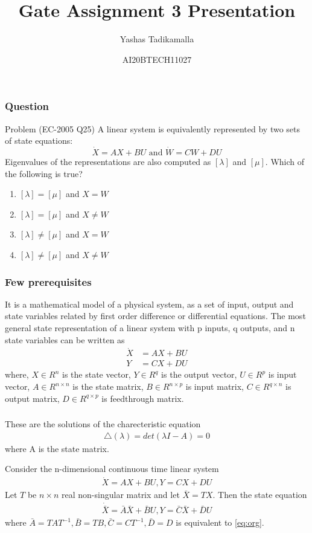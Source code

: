 \documentclass{beamer}
\title{Gate Assignment 3 Presentation}
\author{Yashas Tadikamalla}
\date{AI20BTECH11027}
\begin{document}
\begin{frame}
\titlepage
\end{frame}
\begin{frame}
\frametitle{Question}
\begin{block}{Problem (EC-2005 Q25)}
A linear system is equivalently represented by two sets of state equations:
$$\dot X=AX+BU \text{ and } \dot W=CW+DU$$
Eigenvalues of the representations are also computed as $[\lambda]$ and $[\mu]$. Which of the following is true?
\begin{enumerate}
    \item $[\lambda]=[\mu]$ and $X=W$
    \item $[\lambda]=[\mu]$ and $X\neq W$
    \item $[\lambda]\neq [\mu]$ and $X=W$
    \item $[\lambda]\neq[\mu]$ and $X\neq W$
\end{enumerate}
\end{block}
\end{frame}

\begin{frame}
\frametitle{Few prerequisites}
\begin{definition}
It is a mathematical model of a physical system, as a set of input, output and state variables related by first order difference or differential equations. The most general state representation of a linear system with p inputs, q outputs, and n state variables can be written as
\begin{align}
    \dot X&=AX+BU\\
    Y&=CX+DU
\end{align}
where, $X\in R^n$ is the state vector, $Y\in R^q$ is the output vector, $U\in R^p$ is input vector, $A\in R^{n\times n}$ is the state matrix, $B\in R^{n\times p}$ is input matrix, $C\in R^{q\times n}$ is output matrix, $D\in R^{q\times p}$ is feedthrough matrix.
\end{definition}
\end{frame}

\begin{frame}
\frametitle{}
\begin{definition} 
These are the solutions of the charecteristic equation
\begin{align}
    \triangle(\lambda)=det(\lambda I-A)=0
\end{align}
where A is the state matrix. 
\end{definition}
\begin{theorem}
Consider the n-dimensional continuous time linear system
\begin{align}
    \dot X=AX+BU, Y=CX+DU
    \label{eq:org}
\end{align}
Let $T$ be $n\times n$ real non-singular matrix and let $\bar X= TX$. Then the state equation 
\begin{align}
    \dot{\bar X}=\bar A\bar X+ \bar BU, Y=\bar C\bar X+\bar DU
    \label{eq:new}
\end{align}
where $\bar A=TAT^{-1}, \bar B=TB, \bar C=CT^{-1}, \bar D=D$ is equivalent to \eqref{eq:org}.
\label{eq:th1}
\end{theorem}
\end{frame}
\end{document}
